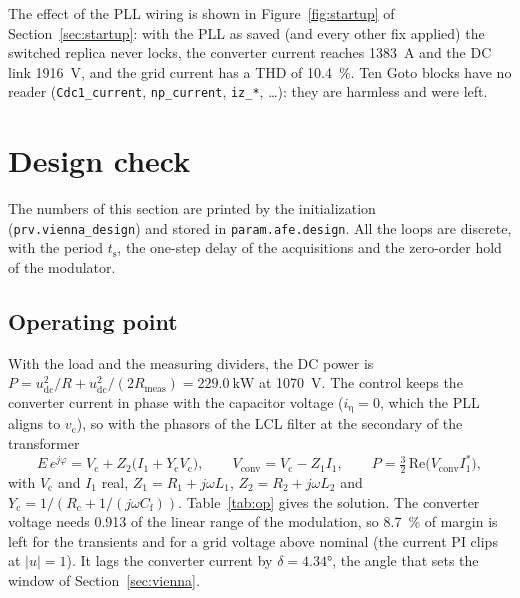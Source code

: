 \documentclass[11pt,a4paper]{scrartcl}
\newcommand{\ped}[1]{_{\mathrm{#1}}}
\newcommand{\code}[1]{\texttt{#1}}
\begin{document}
\begin{onehalfspace}
The effect of the PLL wiring is shown in Figure~\ref{fig:startup} of Section~\ref{sec:startup}: with the PLL as saved (and every other fix applied) the switched replica never locks, the converter current reaches \SI{1383}{\ampere} and the DC link \SI{1916}{\volt}, and the grid current has a THD of \num{10.4}~\%. Ten Goto blocks have no reader (\code{Cdc1\_current}, \code{np\_current}, \code{iz\_*}, \ldots): they are harmless and were left.

\section{Design check}
\label{sec:design}

The numbers of this section are printed by the initialization (\code{prv.vienna\_design}) and stored in \code{param.afe.design}. All the loops are discrete, with the period $t\ped{s}$, the one-step delay of the acquisitions and the zero-order hold of the modulator.

\subsection{Operating point}
\label{sec:op}

With the load and the measuring dividers, the DC power is $P = u\ped{dc}^2/R + u\ped{dc}^2/(2R\ped{meas}) = \SI{229.0}{\kilo\watt}$ at \SI{1070}{\volt}. The control keeps the converter current in phase with the capacitor voltage ($i\ped{\eta} = 0$, which the PLL aligns to $v\ped{c}$), so with the phasors of the LCL filter at the secondary of the transformer
\begin{equation}
	E\, e^{j\varphi} = V\ped{c} + Z_2 \big(I_1 + Y\ped{c} V\ped{c}\big), \qquad V\ped{conv} = V\ped{c} - Z_1 I_1, \qquad P = \tfrac32\, \mathrm{Re}\big(V\ped{conv} I_1^*\big),
	\label{eq:op}
\end{equation}
with $V\ped{c}$ and $I_1$ real, $Z_1 = R_1 + j\omega L_1$, $Z_2 = R_2 + j\omega L_2$ and $Y\ped{c} = 1/(R\ped{c} + 1/(j\omega C\ped{f}))$. Table~\ref{tab:op} gives the solution. The converter voltage needs \num{0.913} of the linear range of the modulation, so 8.7~\% of margin is left for the transients and for a grid voltage above nominal (the current PI clips at $|u| = 1$). It lags the converter current by $\delta = \ang{4.34}$, the angle that sets the window of Section~\ref{sec:vienna}.


\end{onehalfspace}
\end{document}
